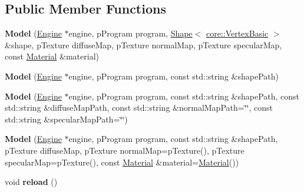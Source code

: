 \subsection*{Public Member Functions}
\begin{DoxyCompactItemize}
\item 
\hypertarget{classfillwave_1_1models_1_1Model_a5df801152c40789eca8e714d5c66ef38}{}{\bfseries Model} (\hyperlink{classfillwave_1_1Engine}{Engine} $\ast$engine, p\+Program program, \hyperlink{classfillwave_1_1models_1_1Shape}{Shape}$<$ \hyperlink{structfillwave_1_1core_1_1VertexBasic}{core\+::\+Vertex\+Basic} $>$ \&shape, p\+Texture diffuse\+Map, p\+Texture normal\+Map, p\+Texture specular\+Map, const \hyperlink{classfillwave_1_1models_1_1Material}{Material} \&material)\label{classfillwave_1_1models_1_1Model_a5df801152c40789eca8e714d5c66ef38}

\item 
\hypertarget{classfillwave_1_1models_1_1Model_adc746edb80df0da6a33e108bcd860e95}{}{\bfseries Model} (\hyperlink{classfillwave_1_1Engine}{Engine} $\ast$engine, p\+Program program, const std\+::string \&shape\+Path)\label{classfillwave_1_1models_1_1Model_adc746edb80df0da6a33e108bcd860e95}

\item 
\hypertarget{classfillwave_1_1models_1_1Model_aafd17810b12882bade01cdb51267be56}{}{\bfseries Model} (\hyperlink{classfillwave_1_1Engine}{Engine} $\ast$engine, p\+Program program, const std\+::string \&shape\+Path, const std\+::string \&diffuse\+Map\+Path, const std\+::string \&normal\+Map\+Path=\char`\"{}\char`\"{}, const std\+::string \&specular\+Map\+Path=\char`\"{}\char`\"{})\label{classfillwave_1_1models_1_1Model_aafd17810b12882bade01cdb51267be56}

\item 
\hypertarget{classfillwave_1_1models_1_1Model_a763c550189ed4cb8bd3fa7ca09ee8de9}{}{\bfseries Model} (\hyperlink{classfillwave_1_1Engine}{Engine} $\ast$engine, p\+Program program, const std\+::string \&shape\+Path, p\+Texture diffuse\+Map, p\+Texture normal\+Map=p\+Texture(), p\+Texture specular\+Map=p\+Texture(), const \hyperlink{classfillwave_1_1models_1_1Material}{Material} \&material=\hyperlink{classfillwave_1_1models_1_1Material}{Material}())\label{classfillwave_1_1models_1_1Model_a763c550189ed4cb8bd3fa7ca09ee8de9}

\item 
\hypertarget{classfillwave_1_1models_1_1Model_abe4723be91d2b4af304bdc8c36268266}{}void {\bfseries reload} ()\label{classfillwave_1_1models_1_1Model_abe4723be91d2b4af304bdc8c36268266}


\end{DoxyCompactItemize}
